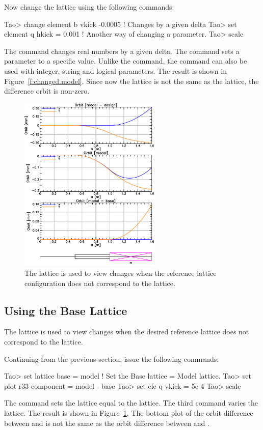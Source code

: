 \documentclass{hitec}     %
\begin{document}
{{{{Now change the  lattice using the following commands:
\begin{code}
Tao> change element b vkick  -0.0005   ! Changes by a given delta
Tao> set element q hkick = 0.001       ! Another way of changing a parameter.
Tao> scale
\end{code}
The  command changes real numbers by a given delta. The  command sets a 
parameter to a specific value. Unlike the  command, 
the  command can also be used with integer, string and logical
parameters.  The result is shown in Figure~\ref{f:changed.model}. Since now
the  lattice is not the same as the  lattice, the difference orbit is non-zero.

\begin{figure}[tb]
  \centering
  \includegraphics[width=0.6\textwidth]{figures/with-base.pdf}
  \caption{The  lattice is used to view changes when the reference lattice configuration
does not correspond to the  lattice.}
  \label{f:base}
\end{figure}

\subsection{Using the Base Lattice}

The  lattice is used to view changes when the desired reference lattice does not
correspond to the  lattice.

Continuing from the previous section, issue the following commands:
\begin{code}
Tao> set lattice base = model  ! Set the Base lattice = Model lattice.
Tao> set plot r33 component = model - base
Tao> set ele q vkick = 5e-4
Tao> scale
\end{code} 
The  command sets the  lattice equal to the 
lattice. The third command varies the  lattice.  The result is shown in
Figure~\ref{f:base}. The bottom plot of the orbit difference between  and
 is not the same as the orbit difference between  and .

}}}}
\end{document}
